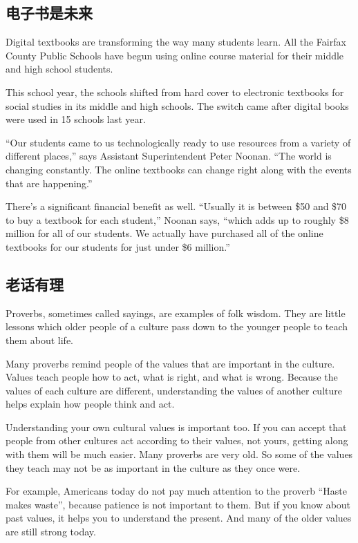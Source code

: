 \subsection{电子书是未来}
Digital textbooks are transforming the way many students
learn. All the Fairfax County Public Schools have begun using online course
material for their middle and high school students.

This school year, the schools shifted from hard cover
to electronic textbooks for social studies in its middle and
high schools. The switch came after digital books were
used in 15 schools last year.


“Our students came to us technologically ready to use resources
from a variety of different places,” says Assistant
Superintendent Peter Noonan. “The world is changing constantly.
The online textbooks can change right along with
the events that are happening.”

There's a significant financial benefit as well. “Usually it is
between \$50 and \$70 to buy a textbook for each student,”
Noonan says, “which adds up to roughly \$8 million for
all of our students. We actually have purchased all of the
online textbooks for our students for just under \$6 million.”

\subsection{老话有理}
Proverbs, sometimes called sayings, are examples of folk
wisdom. They are little lessons which older people of a
culture pass down to the younger people to teach them
about life.

Many proverbs remind people of the values that are
important in the culture. Values teach people how to act,
what is right, and what is wrong. Because the values of
each culture are different, understanding the values of
another culture helps explain how people think and act.

Understanding your own cultural values is important too.
If you can accept that people from other cultures act according
to their values, not yours, getting along with them
will be much easier. Many proverbs are very old. So
some of the values they teach may not be as important in
the culture as they once were.

For example, Americans today do not pay much attention
to the proverb “Haste makes waste”, because patience is
not important to them. But if you know about past values, it
helps you to understand the present. And many of the older
values are still strong today.

